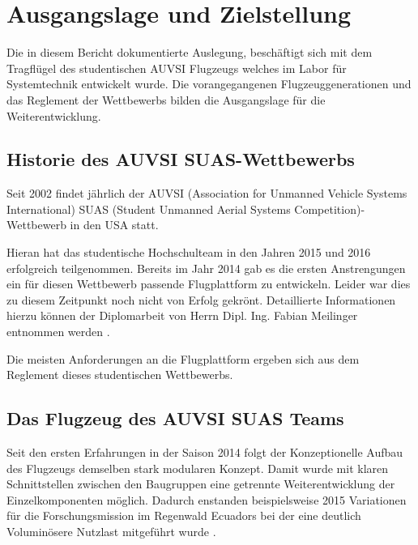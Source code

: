 \chapter{Ausgangslage und Zielstellung}\label{cha:Ausgangslage und Zielstellung}

Die in diesem Bericht dokumentierte Auslegung, beschäftigt sich mit dem Tragflügel des studentischen AUVSI Flugzeugs welches im Labor für Systemtechnik entwickelt wurde. Die vorangegangenen Flugzeuggenerationen und das Reglement der Wettbewerbs bilden die Ausgangslage für die Weiterentwicklung.

\section{Historie des AUVSI SUAS-Wettbewerbs}
Seit 2002 findet jährlich der AUVSI (Association for Unmanned Vehicle Systems International) SUAS (Student Unmanned Aerial Systems Competition)-Wettbewerb in den USA statt.

Hieran hat das studentische Hochschulteam in den Jahren 2015 und 2016 erfolgreich teilgenommen. Bereits im Jahr 2014 gab es die ersten Anstrengungen ein für diesen Wettbewerb passende Flugplattform zu entwickeln. Leider war dies zu diesem Zeitpunkt noch nicht von Erfolg gekrönt. Detaillierte Informationen hierzu können der Diplomarbeit von Herrn Dipl. Ing. Fabian Meilinger entnommen werden \cite{Meiling}.

Die meisten Anforderungen an die Flugplattform ergeben sich aus dem Reglement dieses studentischen Wettbewerbs. 

\clearpage

\section{Das Flugzeug des AUVSI SUAS Teams}

Seit den ersten Erfahrungen in der Saison 2014 folgt der Konzeptionelle Aufbau des Flugzeugs demselben stark modularen Konzept. Damit wurde mit klaren Schnittstellen zwischen den Baugruppen eine getrennte Weiterentwicklung der Einzelkomponenten möglich. Dadurch enstanden beispielsweise 2015 Variationen für die Forschungsmission im Regenwald Ecuadors bei der eine deutlich Voluminösere Nutzlast mitgeführt wurde \cite{Niclas}.

